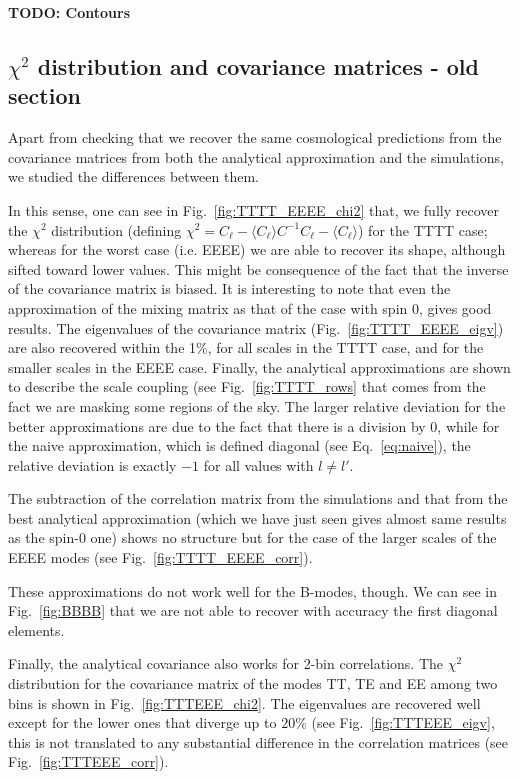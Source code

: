 \documentclass[a4paper,11pt]{article}
\newcommand{\todo}[1]{{\bf TODO: #1}}
\newcommand{\cl}{C_\ell}
\begin{document}
\todo{Contours}

\subsection{$\chi^2$ distribution and covariance matrices - old section}
Apart from checking that we recover the same cosmological predictions from the
covariance matrices from both the analytical approximation and the
simulations, we studied the differences between them.

In this sense, one can see in Fig.~\ref{fig:TTTT_EEEE_chi2} that, we fully
recover the $\chi^2$ distribution (defining $\chi^2 = \cl - \langle \cl
\rangle C^{-1} \cl - \langle \cl \rangle$) for the TTTT case; whereas for the
worst case (i.e. EEEE) we are able to recover its shape, although sifted
toward lower values. This might be consequence of the fact that the inverse of
the covariance matrix is biased. It is interesting to note that even
the approximation of the mixing matrix as that of the case with spin 0, gives
good results. The eigenvalues of the covariance matrix
(Fig.~\ref{fig:TTTT_EEEE_eigv}) are also recovered within the 1\%, for all
scales in the TTTT case, and for the smaller scales in the EEEE case. Finally,
the analytical approximations are shown to describe the scale coupling (see
Fig.~\ref{fig:TTTT_rows} that comes from the fact we are masking some regions
of the sky. The larger relative deviation for the better approximations are
due to the fact that there is a division by $0$, while for the naive
approximation, which is defined diagonal (see Eq.~\ref{eq:naive}), the
relative deviation is exactly $-1$ for all values with $l \neq l'$.

The subtraction of the correlation matrix from the simulations and that from
the best analytical approximation (which we have just seen gives almost same
results as the spin-0 one) shows no structure but for the case of the larger
scales of the EEEE modes (see Fig.~\ref{fig:TTTT_EEEE_corr}).

These approximations do not work well for the B-modes, though. We can see in
Fig.~\ref{fig:BBBB} that we are not able to recover with accuracy the first
diagonal elements.


Finally, the analytical covariance also works for 2-bin correlations. The
$\chi^2$ distribution for the covariance matrix of the modes TT, TE and EE
among two bins is shown in Fig.~\ref{fig:TTTEEE_chi2}. The eigenvalues
are recovered well except for the lower ones that diverge up to $20\%$ (see
Fig.~\ref{fig:TTTEEE_eigv}, this is not translated to any substantial
difference in the correlation matrices (see Fig.~\ref{fig:TTTEEE_corr}).
\end{document}
